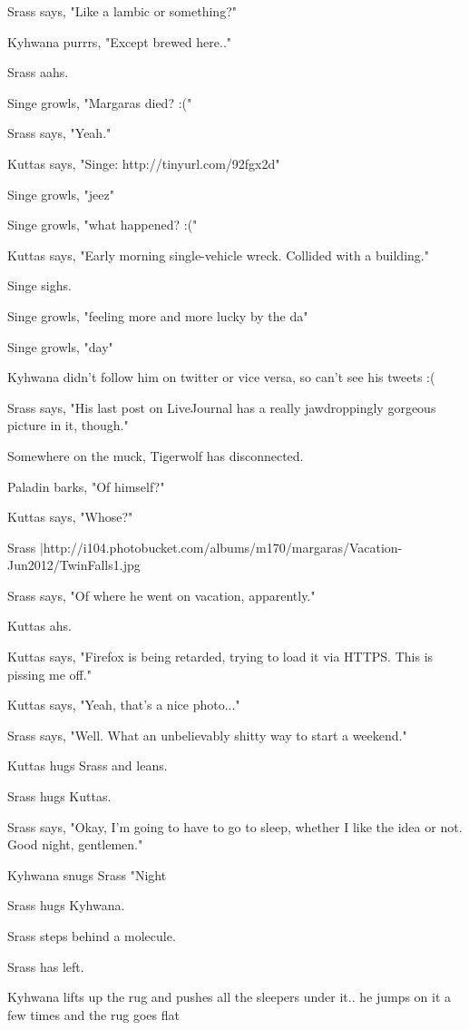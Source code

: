 Srass says, "Like a lambic or something?"

Kyhwana purrrs, "Except brewed here.."

Srass aahs.

Singe growls, "Margaras died? :("

Srass says, "Yeah."

Kuttas says, "Singe:  http://tinyurl.com/92fgx2d"

Singe growls, "jeez"

Singe growls, "what happened? :("

Kuttas says, "Early morning single-vehicle wreck. Collided with a building."

Singe sighs.

Singe growls, "feeling more and more lucky by the da"

Singe growls, "day"

Kyhwana didn't follow him on twitter or vice versa, so can't see his tweets :(

Srass says, "His last post on LiveJournal has a really jawdroppingly gorgeous picture in it, though."

Somewhere on the muck, Tigerwolf has disconnected.

Paladin barks, "Of himself?"

Kuttas says, "Whose?"

Srass |http://i104.photobucket.com/albums/m170/margaras/Vacation-Jun2012/TwinFalls1.jpg

Srass says, "Of where he went on vacation, apparently."

Kuttas ahs.

Kuttas says, "Firefox is being retarded, trying to load it via HTTPS. This is pissing me off."

Kuttas says, "Yeah, that's a nice photo..."

Srass says, "Well.  What an unbelievably shitty way to start a weekend."

Kuttas hugs Srass and leans.

Srass hugs Kuttas.

Srass says, "Okay, I'm going to have to go to sleep, whether I like the idea or not.  Good night, gentlemen."

Kyhwana snugs Srass "Night

Srass hugs Kyhwana.

Srass steps behind a molecule.

Srass has left.

Kyhwana lifts up the rug and pushes all the sleepers under it.. he jumps on it a few times and the rug goes flat

